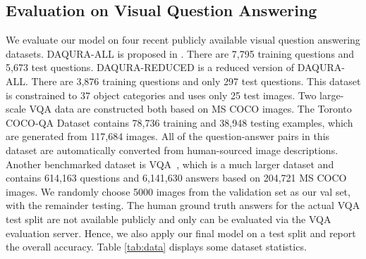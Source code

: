 \documentclass[10pt,journal,compsoc]{IEEEtran}
\begin{document}
\subsection{Evaluation on Visual Question Answering}
We evaluate our model on four recent publicly available visual question answering datasets.
DAQURA-ALL is proposed in \cite{malinowski2014towards}. There are 7,795 training questions and 5,673 test questions. DAQURA-REDUCED is a reduced version of DAQURA-ALL. There are 3,876 training questions and only 297 test questions. This dataset is constrained to 37 object categories and uses only 25 test images. Two large-scale VQA data are constructed both based on MS COCO images. The Toronto COCO-QA Dataset \cite{ren2015image} contains 78,736 training and 38,948 testing examples, which are generated from 117,684 images. All of the question-answer pairs in this dataset are automatically converted from human-sourced image descriptions. Another benchmarked dataset is VQA~\cite{antol2015vqa}, which is a much larger dataset and contains 614,163 questions and 6,141,630 answers based on 204,721 MS COCO images. We randomly choose 5000 images from the validation set as our val set, with the remainder testing. The human ground truth answers for the actual VQA test split are not available publicly and only can be evaluated via the VQA evaluation server. Hence, we also apply our final model on a test split and report the overall accuracy. Table \ref{tab:data} displays some dataset statistics. 

\begin{table}[h]
\begin{center}
\scriptsize
{}
 \vspace{-3pt}
 \caption{Some statistics about the DAQURA, Toronto COCO-QA Dataset \cite{ren2015image} and VQA dataset~\cite{antol2015vqa}.}
 \label{tab:data}
\end{center}
\end{table}
\end{document}
